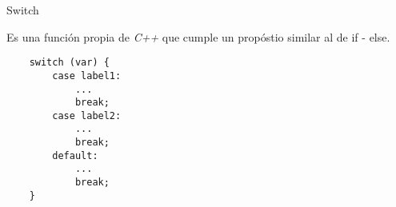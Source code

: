 \begin{frame}[fragile]{Switch}\vspace{10pt}

Es una funci\'on propia de \textit{C++} que cumple un prop\'ostio similar al de if - else.

\begin{center}
\begin{lstlisting}
	switch (var) {
		case label1:
			...
			break;	
		case label2:
			...
			break;
		default:
			...
			break;
	}
\end{lstlisting}
\end{center}

\end{frame}